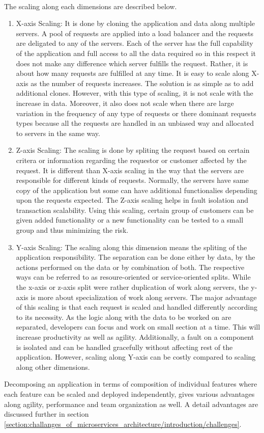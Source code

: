 \\
The scaling along each dimensions are described below. \cite{Fisher:2015aa}\cite{MacVittie:2014aa}\cite{Richardson:2014aa}
\begin{enumerate}
\item X-axis Scaling: It is done by cloning the application and data along multiple servers. A pool of requests are applied into a load balancer and the requests are deligated to any of the servers. Each of the server has the full capability of the application and full access to all the data required so in this respect it does not make any difference which server fulfills the request. Rather, it is about how many requests are fulfilled at any time. It is easy to scale along X-axis as the number of requests increases. The solution is as simple as to add additional clones. However, with this type of scaling, it is not scale with the increase in data. Moreover, it also does not scale when there are large variation in the frequency of any type of requests or there dominant requests types because all the requests are handled in an unbiased way and allocated to servers in the same way.
\\
\item Z-axis Scaling: The scaling is done by spliting the request based on certain critera or information regarding the requestor or customer affected by the request. It is different than X-axis scaling in the way that the servers are responsible for different kinds of requests. Normally, the servers have same copy of the application but some can have additional functionalies depending upon the requests expected. The Z-axis scaling helps in fault isolation and transaction scalability. Using this scaling, certain group of customers can be given added functionality or a new functionality can be tested to a small group and thus minimizing the risk.
\\
\item Y-axis Scaling: The scaling along this dimension means the spliting of the application responsibility. The separation can be done either by data, by the actions performed on the data or by combination of both. The respective ways can be referred to as resoure-oriented or service-oriented splits. While the x-axis or z-axis split were rather duplication of work along servers, the y-axis is more about specialization of work along servers. The major advantage of this scaling is that each request is scaled and handled differently according to its necessity. As the logic along with the data to be worked on are separated, developers can focus and work on small section at a time. This will increase productivity as well as agility. Additionally, a fault on a component is isolated and can be handled gracefully without affecting rest of the application. However, scaling along Y-axis can be costly compared to scaling along other dimensions.
\end{enumerate}
Decomposing an application in terms of composition of individual features where each feature can be scaled and deployed independently, gives various advantages along agility, performance and team organization as well. A detail advantages are discussed further in section \ref{section:challanges_of_microservices_architecture/introduction/challenges}.
